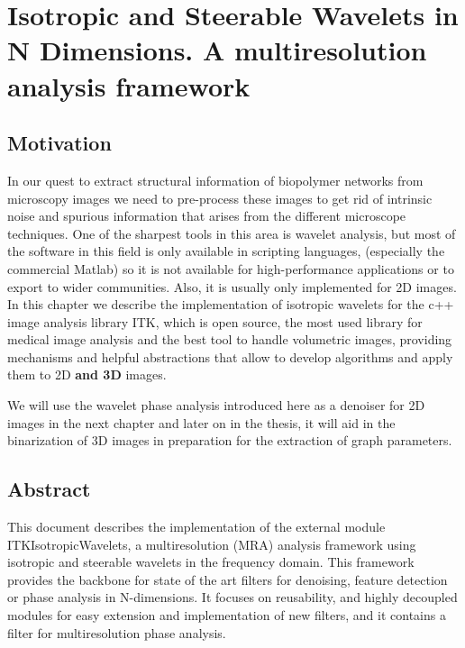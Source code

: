 
\chapter{Isotropic and Steerable Wavelets in N Dimensions. A multiresolution analysis framework}

\label{Chapter-Wavelets} %


\section{Motivation}

In our quest to extract structural information of biopolymer networks from microscopy images
we need to pre-process these images to get rid of intrinsic noise and spurious information
that arises from the different microscope techniques. One of the sharpest tools in this area is wavelet analysis, but most of the software in this field is only available in scripting languages, (especially the commercial Matlab) so it is not available for high-performance applications
or to export to wider communities. Also, it is usually only implemented for 2D images. In this chapter we describe the implementation of isotropic wavelets for the c++ image analysis library ITK, which is open source, the most used library for medical image analysis and the best tool to handle volumetric images, providing mechanisms and helpful abstractions that allow to develop algorithms and apply them to 2D \textbf{and 3D} images.

We will use the wavelet phase analysis introduced here as a denoiser for 2D images in the next chapter and later on in the thesis, it will aid in the binarization of 3D images in preparation for the extraction of graph parameters.

\section{Abstract}
\noindent
This document describes the implementation of the external module ITKIsotropicWavelets, a multiresolution (MRA) analysis framework using isotropic and steerable wavelets in the frequency domain. This framework provides the backbone for state of the art filters for denoising, feature detection or phase analysis in N-dimensions. It focuses on reusability, and highly decoupled modules for easy extension and implementation of new filters, and it contains a filter for multiresolution phase analysis.

